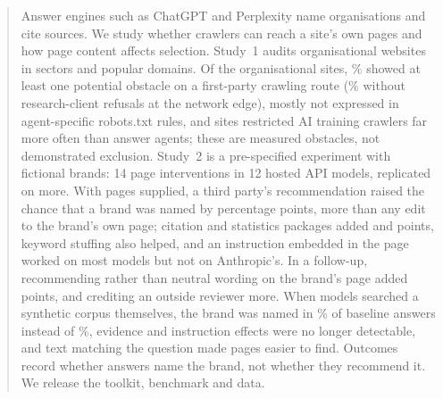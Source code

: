 \begin{abstract}
\noindent Answer engines such as ChatGPT and Perplexity name organisations and cite sources. We study whether crawlers can reach a site's own pages and how page content
affects selection. Study~1 audits \NSites{} organisational websites in \NSectors{} sectors and
\RandSites{} popular domains. Of the organisational sites, \BarAny\% showed at least one
potential obstacle on a first-party crawling route (\BarNoEdge\% without research-client refusals at the network
edge), mostly not expressed in agent-specific robots.txt rules, and sites restricted AI training crawlers far more
often than answer agents; these are measured obstacles, not demonstrated exclusion. Study~2 is a
pre-specified experiment with fictional brands: 14 page interventions in 12 hosted API models, replicated on
\FlNModelsTwo{} more. With pages supplied, a third party's recommendation raised the chance that a
brand was named by \EMenAllThirdPartyU{} percentage points, more than any edit to the brand's own page; citation and
statistics packages added \EMenAllCitationsU{} and \EMenAllStatisticsU{} points, keyword stuffing also helped, and an
instruction embedded in the page worked on most models but not on Anthropic's. In a follow-up, recommending rather than neutral
wording on the brand's page added \AttrRecU{} points, and crediting an outside reviewer \AttrExtU{} more. When \AgNModelsW{} models searched a
synthetic corpus themselves, the brand was named in \AgBaseMen\% of baseline answers instead of \AgBaseMenCtx\%,
evidence and instruction effects were no longer detectable, and text matching the question made pages easier to find.
Outcomes record whether answers name the brand, not whether they recommend it. We release the toolkit, benchmark and
data.
\end{abstract}
